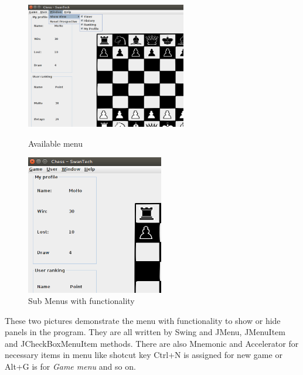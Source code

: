 \documentclass[a4paper,10pt]{article}
\begin{document}
\clearpage
\pagebreak
\begin{figure}[!htb]
  \includegraphics[width=7cm]{Menu.png}
  \caption{Available menu  \label{fig:menu1}}
\endminipage\hfill
{}
  \includegraphics[width=6cm]{Menu2.png}
  \caption{Sub Menus with functionality  \label{fig:menu2}}
\endminipage\hfill
\end{figure}
These two pictures demonstrate the menu with functionality to show or hide panels in the program. They are all written by Swing and JMenu, JMenuItem and JCheckBoxMenuItem methods. There are also Mnemonic and Accelerator for necessary items in menu like shotcut key Ctrl+N is assigned for new game or Alt+G is for \textit{Game menu} and so on. 
\end{document}
